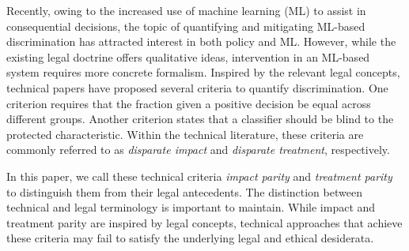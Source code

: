 
Recently, owing to the increased use
of machine learning (ML) 
to assist in consequential decisions,
the topic of quantifying and mitigating
ML-based discrimination 
has attracted interest 
in both policy and ML.
However, while the existing legal doctrine 
offers qualitative ideas,
intervention in an ML-based system 
requires more concrete 
formalism.
%
%
%
%
Inspired by the relevant legal concepts, technical papers have proposed several criteria 
to quantify discrimination. 
One criterion requires that 
the fraction given a positive decision be equal
across different groups.
Another criterion states that 
a classifier should be blind to the protected characteristic. Within the technical literature, these criteria are commonly referred to as \emph{disparate impact} and \emph{disparate treatment}, respectively.  


In this paper, we call these technical criteria \emph{impact parity} and \emph{treatment parity} 
to distinguish them from their legal antecedents.  
The distinction between 
technical and legal terminology 
is important to maintain. 
While impact and treatment parity 
are inspired by legal concepts, 
technical approaches that achieve these criteria 
may fail to satisfy 
the underlying legal and ethical desiderata. 


